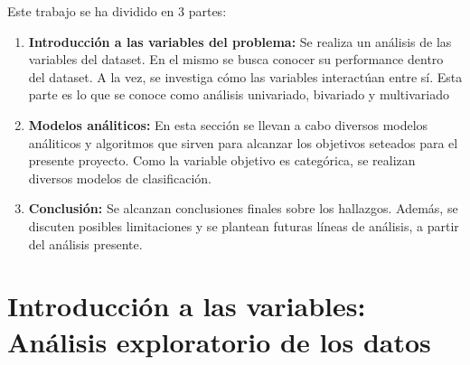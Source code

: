 \documentclass[a4paper]{article}
\begin{document}
        Este trabajo se ha dividido en 3 partes:
        \begin{enumerate}
            \item \textbf{Introducción a las variables del problema:} Se realiza un análisis de las variables del dataset. En el mismo se busca conocer su performance dentro del dataset. A la vez, se investiga cómo las variables interactúan entre sí. Esta parte es lo que se conoce como análisis univariado, bivariado y multivariado
            \item \textbf{Modelos análiticos:} En esta sección se llevan a cabo diversos modelos análiticos y algoritmos que sirven para alcanzar los objetivos seteados para el presente proyecto. Como la variable objetivo es categórica, se realizan diversos modelos de clasificación.
            \item \textbf{Conclusión:} Se alcanzan conclusiones finales sobre los hallazgos. Además, se discuten posibles limitaciones y se plantean futuras líneas de análisis, a partir del análisis presente.
            
        \end{enumerate}

\newpage

\section{Introducción a las variables: Análisis exploratorio de los datos}
 
\end{document}
